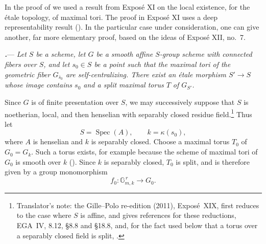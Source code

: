 In the proof of  we used a result from Exposé XI on the
local existence, for the étale topology, of maximal tori.  The proof
in Exposé XI uses a deep representability result \textup{()}.
In the particular case under consideration, one can give another,
far more elementary proof, based on the ideas of Exposé XII, no.~7.

\par\medskip\noindent
{}\textbf{\textit{.}}---
\textit{Let \(S\) be a scheme, let \(G\) be a smooth affine
\(S\)-group scheme with connected fibers over \(S\), and let
\(s_0\in S\) be a point such that the maximal tori of the geometric
fiber \(G_{\bar s_0}\) are self-centralizing.  There exist an étale
morphism \(S'\to S\) whose image contains \(s_0\) and a split maximal
torus \(T\) of \(G_{S'}\).}

Since \(G\) is of finite presentation over \(S\), we may successively
suppose that \(S\) is noetherian, local, and then henselian with
separably closed residue field.\footnote{Translator's note: the Gille--Polo re-edition (2011), Exposé~XIX, first reduces
to the case where \(S\) is affine, and gives references for these reductions,
EGA~IV, 8.12, §8.8 and §18.8, and, for the fact used below that a torus over a
separably closed field is split, .}  Thus let
\[
  S=\operatorname{Spec}(A),
  \qquad
  k=\kappa(s_0),
\]
where \(A\) is henselian and \(k\) is separably closed.  Choose a
maximal torus \(T_0\) of \(G_0=G_k\).  Such a torus exists, for
example because the scheme of maximal tori of \(G_0\) is smooth over
\(k\) \textup{()}.  Since \(k\) is separably
closed, \(T_0\) is split, and is
therefore given by a group monomorphism
\[
  f_0\colon \mathbb G_{m,k}^{\,r}\longrightarrow G_0.
\]
